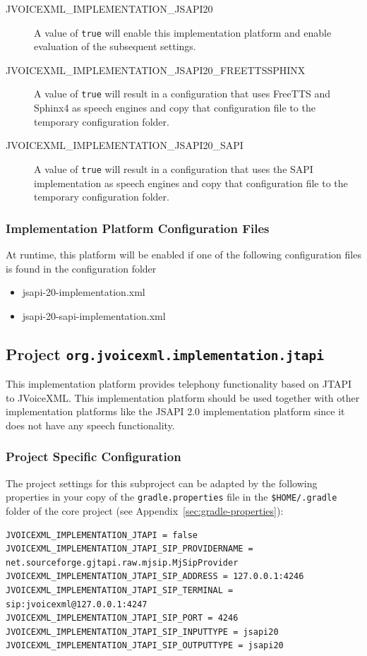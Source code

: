 \documentclass[11pt,a4paper]{article}
\begin{document}
\begin{description}
\item[JVOICEXML\_IMPLEMENTATION\_JSAPI20] A value of \texttt{true} will enable this implementation
platform and enable evaluation of the subsequent settings.
\item[JVOICEXML\_IMPLEMENTATION\_JSAPI20\_FREETTSSPHINX] A value of \texttt{true} will result in a
configuration that uses FreeTTS and Sphinx4 as speech engines and copy that configuration file to the temporary
configuration folder.
\item[JVOICEXML\_IMPLEMENTATION\_JSAPI20\_SAPI]  A value of \texttt{true} will result in a
configuration that uses the SAPI implementation as speech engines and copy that configuration file to the temporary
configuration folder.
\end{description}

\subsubsection{Implementation Platform Configuration Files}

At runtime, this platform will be enabled if one of the following configuration files is found in the configuration
folder
\begin{itemize}
\item jsapi-20-implementation.xml
\item jsapi-20-sapi-implementation.xml
\end{itemize}

\subsection{Project \texttt{org.jvoicexml.implementation.jtapi}}

This implementation platform provides telephony functionality based on JTAPI to
JVoiceXML. This implementation platform should be used together with other
implementation platforms like the JSAPI 2.0 implementation platform since it
does not have any speech functionality.

\subsubsection{Project Specific Configuration}

The project settings for this subproject can be adapted by the following
properties in your copy of the \texttt{gradle.properties} file in the
\texttt{\${HOME}/.gradle} folder of the core project (see 
Appendix~\ref{sec:gradle-properties}):
\begin{lstlisting}
JVOICEXML_IMPLEMENTATION_JTAPI = false
JVOICEXML_IMPLEMENTATION_JTAPI_SIP_PROVIDERNAME = net.sourceforge.gjtapi.raw.mjsip.MjSipProvider
JVOICEXML_IMPLEMENTATION_JTAPI_SIP_ADDRESS = 127.0.0.1:4246
JVOICEXML_IMPLEMENTATION_JTAPI_SIP_TERMINAL = sip:jvoicexml@127.0.0.1:4247
JVOICEXML_IMPLEMENTATION_JTAPI_SIP_PORT = 4246
JVOICEXML_IMPLEMENTATION_JTAPI_SIP_INPUTTYPE = jsapi20
JVOICEXML_IMPLEMENTATION_JTAPI_SIP_OUTPUTTYPE = jsapi20
\end{lstlisting}
\end{document}
